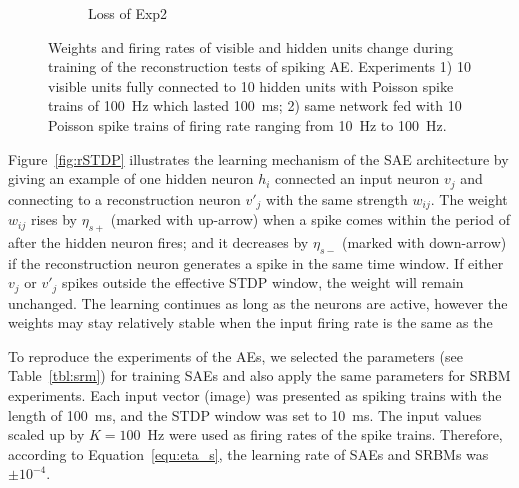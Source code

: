 \begin{figure}
\begin{subfigure}[t]{0.45\textwidth}
		\caption{Loss of Exp2}
	\end{subfigure}
	\caption{Weights and firing rates of visible and hidden units change during training of the reconstruction tests of spiking AE. 
		Experiments 1) 10 visible units fully connected to 10 hidden units with Poisson spike trains of 100~Hz which lasted 100~ms; 2) \protect{} same network fed with 10 Poisson spike trains of firing rate ranging from 10~Hz to 100~Hz.}
	\label{fig:SAE_orig}
\end{figure}

Figure~\ref{fig:rSTDP} illustrates the learning mechanism of the SAE architecture by giving an example of one hidden neuron $h_i$ connected \protect{} \protect{} an input neuron $v_j$ and connecting to a reconstruction neuron $v'_j$ with the same strength $w_{ij}$.
The weight $w_{ij}$ rises by $\eta_{s+}$ (marked with \protect{} up-arrow) when a spike comes within the period of \protect{} \protect{} after the hidden neuron fires;
and it decreases by $\eta_{s-}$ (marked with \protect{} down-arrow) if the reconstruction neuron generates a spike in the same time window.
If either $v_j$ or $v'_j$ spikes outside the effective STDP window, the weight will remain unchanged.
The learning continues as long as the neurons are active, however the weights may stay relatively stable when the input firing rate is the same as the \protect{} \protect{}

To reproduce the experiments of the AEs, we selected the parameters (see Table~\ref{tbl:srm}) for training SAEs and also apply the same parameters for SRBM experiments.
Each input vector (image) was presented as spiking trains with the length of 100~ms, and the STDP window was set to 10~ms.
The input values scaled up by $K=100$~Hz were used as firing rates of the spike trains.
Therefore, according to Equation~\ref{equ:eta_s}, the learning rate of SAEs and SRBMs was $\pm 10^{-4}$.

